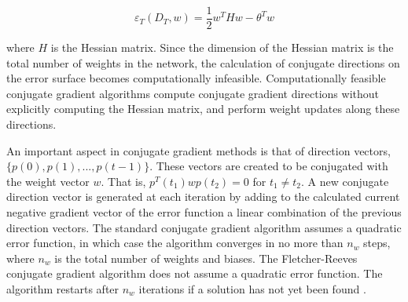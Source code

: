 \begin{equation}
\label{eq:scg1}
\varepsilon_T(D_T,w) = \frac{1}{2}w^THw - \theta^Tw
\end{equation}

where $H$ is the Hessian matrix. Since the dimension of the Hessian matrix is the total number of weights in the network, the calculation of conjugate directions on the error surface becomes computationally infeasible. Computationally feasible conjugate gradient algorithms compute conjugate gradient directions without explicitly computing the Hessian matrix, and perform weight updates along these directions.

An important aspect in conjugate gradient methods is that of direction vectors, $\{p(0),p(1),...,p(t-1)\}$. These vectors are created to be conjugated with the weight vector $w$. That is, $p^T(t_1)wp(t_2) = 0$ for $ t_1 \neq t_2$. A new conjugate direction vector is generated at each iteration by adding to the calculated current negative gradient vector of the error function a linear combination of the previous direction vectors. The standard conjugate gradient algorithm assumes a quadratic error function, in which case the algorithm converges in no more than $n_w$ steps, where $n_w$ is the total number of weights and biases. The Fletcher-Reeves conjugate gradient algorithm does not assume a quadratic error function. The algorithm restarts after $n_w$ iterations if a solution has not yet been found \cite{engelbrecht2007computational}.

